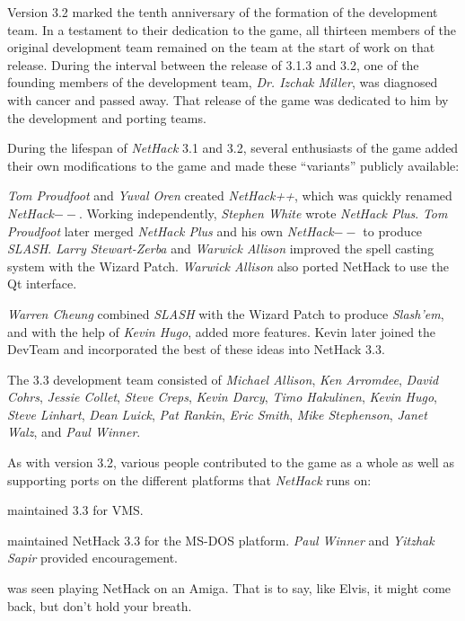 \medskip
\nd Version 3.2 marked the tenth anniversary of the formation of the development
team.  In a testament to their dedication to the game, all thirteen members
of the original development team remained on the team at the start of work on
that release.  During the interval between the release of 3.1.3 and 3.2,
one of the founding members of the development team, {\it Dr. Izchak Miller},
was diagnosed with cancer and passed away.  That release of the game was
dedicated to him by the development and porting teams.

\medskip
During the lifespan of {\it NetHack\/} 3.1 and 3.2, several enthusiasts
of the game added
their own modifications to the game and made these ``variants'' publicly
available:

\medskip
{\it Tom Proudfoot} and {\it Yuval Oren} created {\it NetHack++},
which was quickly renamed {\it NetHack$--$}.
Working independently, {\it Stephen White} wrote {\it NetHack Plus}.
{\it Tom Proudfoot} later merged {\it NetHack Plus}
and his own {\it NetHack$--$} to produce {\it SLASH}.
{\it Larry Stewart-Zerba} and {\it Warwick Allison} improved the spell
casting system with the Wizard Patch.
{\it Warwick Allison} also ported NetHack to use the Qt interface.

\medskip
{\it Warren Cheung} combined {\it SLASH} with the Wizard Patch
to produce {\it Slash'em\/}, and
with the help of {\it Kevin Hugo}, added more features.
Kevin later joined the
DevTeam and incorporated the best of these ideas into NetHack 3.3.

\medskip
The 3.3 development team consisted of {\it Michael Allison}, {\it Ken Arromdee},
{\it David Cohrs}, {\it Jessie Collet}, {\it Steve Creps}, {\it Kevin Darcy},
{\it Timo Hakulinen},
{\it Kevin Hugo}, {\it Steve Linhart}, {\it Dean Luick}, {\it Pat Rankin},
{\it Eric Smith}, {\it Mike Stephenson}, {\it Janet Walz}, and {\it Paul Winner}.

\medskip
As with version 3.2, various people contributed to the game as a whole as
well as supporting ports on the different platforms that {\it NetHack\/}
runs on:

\medskip
{} maintained 3.3 for VMS.

\medskip
{} maintained NetHack 3.3 for the MS-DOS platform.
{\it Paul Winner} and {\it Yitzhak Sapir} provided encouragement.

\medskip
{} was seen playing NetHack on an Amiga.  That is to say, like
Elvis, it might come back, but don't hold your breath.

